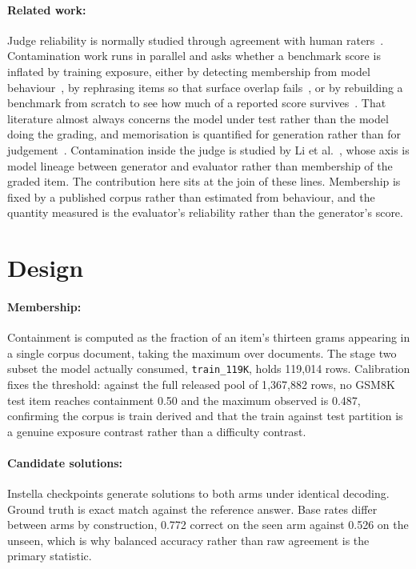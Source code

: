 \documentclass{article}
\begin{document}
\paragraph{Related work:} Judge reliability is normally studied through agreement with
human raters~\citep{zheng2023judging}. Contamination work runs in parallel and asks whether a
benchmark score is inflated by training exposure, either by detecting membership from model
behaviour~\citep{shi2024detecting}, by rephrasing items so that surface overlap
fails~\citep{yang2023rephrased}, or by rebuilding a benchmark from scratch to see how much of
a reported score survives~\citep{zhang2024careful}. That literature almost always concerns
the model under test rather than the model doing the grading, and memorisation is quantified
for generation rather than for judgement~\citep{carlini2023quantifying}. Contamination
inside the judge is studied by Li et al.~\citep{li2025preferenceleakage}, whose axis is model
lineage between generator and evaluator rather than membership of the graded item. The
contribution here sits at the join of these lines. Membership is fixed by a published corpus rather than
estimated from behaviour, and the quantity measured is the evaluator's reliability rather
than the generator's score.

\section{Design}

\paragraph{Membership:} Containment is computed as the fraction of an item's thirteen grams
appearing in a single corpus document, taking the maximum over documents. The stage two
subset the model actually consumed, \texttt{train\_119K}, holds 119{,}014 rows. Calibration
fixes the threshold: against the full released pool of 1{,}367{,}882 rows, no GSM8K test item
reaches containment 0.50 and the maximum observed is 0.487, confirming the corpus is train
derived and that the train against test partition is a genuine exposure contrast rather than
a difficulty contrast.

\paragraph{Candidate solutions:} Instella checkpoints generate solutions to both arms under
identical decoding. Ground truth is exact match against the reference answer. Base rates
differ between arms by construction, 0.772 correct on the seen arm against 0.526 on the
unseen, which is why balanced accuracy rather than raw agreement is the primary statistic.
\end{document}
